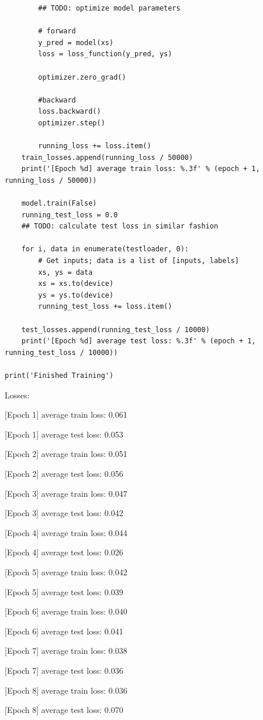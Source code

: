 \documentclass[submit]{harvardml}
\begin{document}
\begin{enumerate}
\begin{lstlisting}
        ## TODO: optimize model parameters

        # forward
        y_pred = model(xs)
        loss = loss_function(y_pred, ys)

        optimizer.zero_grad()
        
        #backward
        loss.backward()
        optimizer.step()

        running_loss += loss.item()
    train_losses.append(running_loss / 50000)
    print('[Epoch %d] average train loss: %.3f' % (epoch + 1, running_loss / 50000))
    
    model.train(False)
    running_test_loss = 0.0
    ## TODO: calculate test loss in similar fashion

    for i, data in enumerate(testloader, 0):
        # Get inputs; data is a list of [inputs, labels]
        xs, ys = data
        xs = xs.to(device)
        ys = ys.to(device)
        running_test_loss += loss.item()

    test_losses.append(running_test_loss / 10000)
    print('[Epoch %d] average test loss: %.3f' % (epoch + 1, running_test_loss / 10000))

print('Finished Training')

\end{lstlisting}

Losses:

[Epoch 1] average train loss: 0.061

[Epoch 1] average test loss: 0.053

[Epoch 2] average train loss: 0.051

[Epoch 2] average test loss: 0.056

[Epoch 3] average train loss: 0.047

[Epoch 3] average test loss: 0.042

[Epoch 4] average train loss: 0.044

[Epoch 4] average test loss: 0.026

[Epoch 5] average train loss: 0.042

[Epoch 5] average test loss: 0.039

[Epoch 6] average train loss: 0.040

[Epoch 6] average test loss: 0.041

[Epoch 7] average train loss: 0.038

[Epoch 7] average test loss: 0.036

[Epoch 8] average train loss: 0.036

[Epoch 8] average test loss: 0.070


\end{enumerate}
\end{document}
